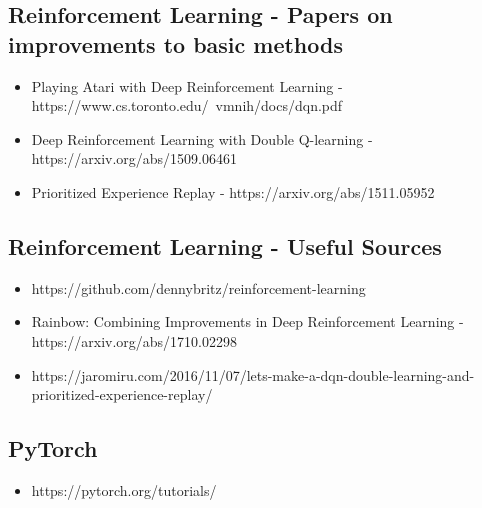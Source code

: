 \documentclass{article}
\begin{document}
\subsection{Reinforcement Learning - Papers on improvements to basic methods}
\begin{itemize}
\item Playing Atari with Deep Reinforcement Learning - https://www.cs.toronto.edu/~vmnih/docs/dqn.pdf
\item 
Deep Reinforcement Learning with Double Q-learning - https://arxiv.org/abs/1509.06461
\item Prioritized Experience Replay - https://arxiv.org/abs/1511.05952
\end{itemize}
\subsection{Reinforcement Learning - Useful Sources}
\begin{itemize}
\item https://github.com/dennybritz/reinforcement-learning
\item 
Rainbow: Combining Improvements in Deep Reinforcement Learning - https://arxiv.org/abs/1710.02298
\item https://jaromiru.com/2016/11/07/lets-make-a-dqn-double-learning-and-prioritized-experience-replay/
\end{itemize}
\subsection{PyTorch}
\begin{itemize}
\item https://pytorch.org/tutorials/
\end{itemize}
\end{document}
